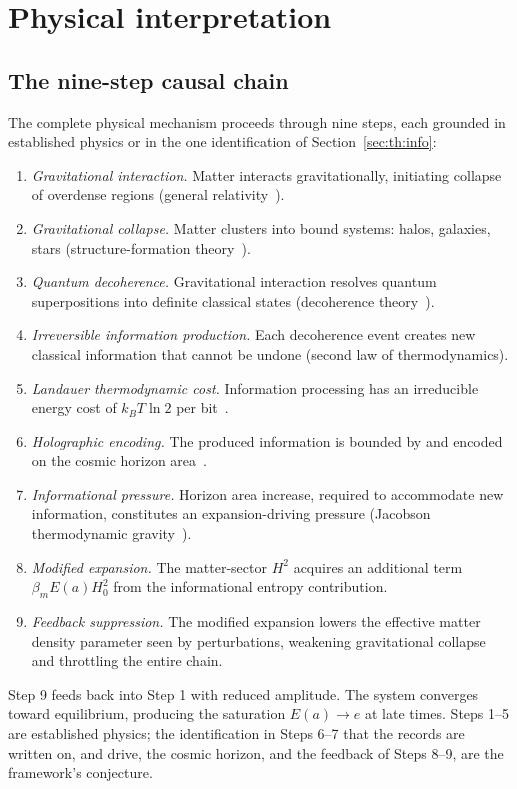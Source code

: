 \section{Physical interpretation}\label{sec:th:interp}
\subsection{The nine-step causal chain}
The complete physical mechanism proceeds through nine steps, each grounded in established physics or in the one identification of
Section~\ref{sec:th:info}:
\begin{enumerate}
\item \emph{Gravitational interaction.} Matter interacts gravitationally, initiating collapse of overdense regions (general relativity~\cite{Einstein1915}).
\item \emph{Gravitational collapse.} Matter clusters into bound systems: halos, galaxies, stars (structure-formation theory~\cite{Peebles1980}).
\item \emph{Quantum decoherence.} Gravitational interaction resolves quantum superpositions into definite classical states (decoherence theory~\cite{Zurek2003}).
\item \emph{Irreversible information production.} Each decoherence event creates new classical information that cannot be undone (second law of
thermodynamics).
\item \emph{Landauer thermodynamic cost.} Information processing has an irreducible energy cost of $k_BT\ln2$ per bit~\cite{Landauer1961}.
\item \emph{Holographic encoding.} The produced information is bounded by and encoded on the cosmic horizon area~\cite{Bekenstein1973,tHooft1993,Susskind1995}.
\item \emph{Informational pressure.} Horizon area increase, required to accommodate new information, constitutes an expansion-driving pressure (Jacobson
thermodynamic gravity~\cite{Jacobson1995}).
\item \emph{Modified expansion.} The matter-sector $H^2$ acquires an additional term $\beta_mE(a)H_0^2$ from the informational entropy contribution.
\item \emph{Feedback suppression.} The modified expansion lowers the effective matter density parameter seen by perturbations, weakening gravitational
collapse and throttling the entire chain.
\end{enumerate}
Step 9 feeds back into Step 1 with reduced amplitude. The system converges toward equilibrium, producing the saturation $E(a)\to e$ at late times.
Steps 1--5 are established physics; the identification in Steps 6--7 that the records are written on, and drive, the cosmic horizon, and the feedback
of Steps 8--9, are the framework's conjecture. \conjecture

